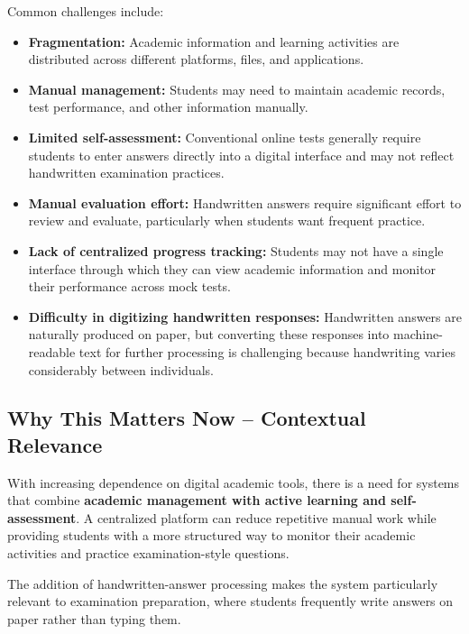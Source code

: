 \documentclass[11pt,a4paper]{article}
\begin{document}
Common challenges include:

\begin{itemize}
    \item \textbf{Fragmentation:} Academic information and learning activities are distributed across different platforms, files, and applications.

    \item \textbf{Manual management:} Students may need to maintain academic records, test performance, and other information manually.

    \item \textbf{Limited self-assessment:} Conventional online tests generally require students to enter answers directly into a digital interface and may not reflect handwritten examination practices.

    \item \textbf{Manual evaluation effort:} Handwritten answers require significant effort to review and evaluate, particularly when students want frequent practice.

    \item \textbf{Lack of centralized progress tracking:} Students may not have a single interface through which they can view academic information and monitor their performance across mock tests.

    \item \textbf{Difficulty in digitizing handwritten responses:} Handwritten answers are naturally produced on paper, but converting these responses into machine-readable text for further processing is challenging because handwriting varies considerably between individuals.
\end{itemize}

\subsection{Why This Matters Now -- Contextual Relevance}

With increasing dependence on digital academic tools, there is a need for systems that combine \textbf{academic management with active learning and self-assessment}. A centralized platform can reduce repetitive manual work while providing students with a more structured way to monitor their academic activities and practice examination-style questions.

The addition of handwritten-answer processing makes the system particularly relevant to examination preparation, where students frequently write answers on paper rather than typing them.
\end{document}

